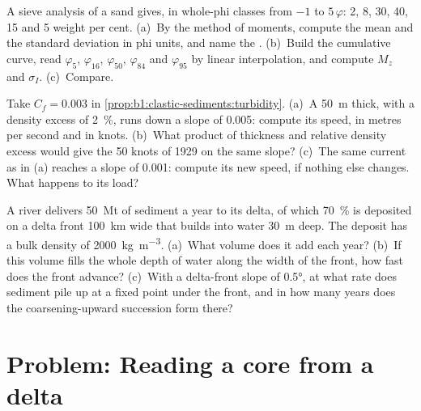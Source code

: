 \begin{exercise}[$\star\star\star$]\label{exo:b1:clastic-sediments:10}
A sieve analysis of a sand gives, in whole-phi classes from $-1$ to
$5\,\varphi$: 2, 8, 30, 40, 15 and 5 weight per cent. (a)~By the method of
moments, compute the mean and the standard deviation in phi units, and name the
. (b)~Build the cumulative curve, read $\varphi_5$, $\varphi_{16}$,
$\varphi_{50}$, $\varphi_{84}$ and $\varphi_{95}$ by linear interpolation, and
compute $M_z$ and $\sigma_I$. (c)~Compare.
\end{exercise}

\begin{exercise}[$\star\star\star$]\label{exo:b1:clastic-sediments:11}
Take $C_f = 0.003$ in \cref{prop:b1:clastic-sediments:turbidity}. (a)~A
 \qty{50}{m} thick, with a density excess of
\qty{2}{\percent}, runs down a slope of \num{0.005}: compute its speed, in metres
per second and in knots. (b)~What product of thickness and relative density
excess would give the 50 knots of 1929 on the same slope? (c)~The same current
as in (a) reaches a slope of \num{0.001}: compute its new speed, if nothing
else changes. What happens to its load?
\end{exercise}

\begin{exercise}[$\star\star\star$]\label{exo:b1:clastic-sediments:12}
A river delivers \qty{50}{Mt} of sediment a year to its delta, of which
\qty{70}{\percent} is deposited on a delta front \qty{100}{km} wide that builds
into water \qty{30}{m} deep. The deposit has a bulk density of
\qty{2000}{kg.m^{-3}}. (a)~What volume does it add each year? (b)~If this volume
fills the whole depth of water along the width of the front, how fast does the
front advance? (c)~With a delta-front slope of \ang{0.5}, at what rate does
sediment pile up at a fixed point under the front, and in how many years does
the coarsening-upward succession form there?
\end{exercise}

\section{Problem: Reading a core from a delta}

